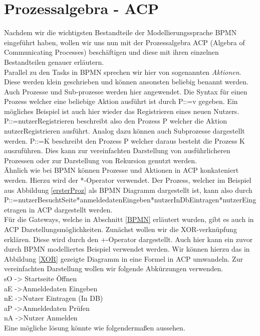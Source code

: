 \section {Prozessalgebra - ACP}\label {Prozessalgebra - ACP}
Nachdem wir die wichtigsten Bestandteile der Modellierungssprache BPMN eingeführt haben, wollen wir uns nun mit der Prozessalgebra ACP (Algebra of Communicating Processes) beschäftigen und diese mit ihren einzelnen Bestandteilen genauer erläutern.\\
Parallel zu den Tasks in BPMN sprechen wir hier von sogenannten \textit{Aktionen}. Diese werden klein geschrieben und können ansonsten beliebig benannt werden. Auch Prozesse und Sub-prozesse werden hier angewendet. Die Syntax für einen Prozess welcher eine beliebige Aktion ausführt ist durch P::=v gegeben. Ein mögliches Beispiel ist auch hier wieder das Registrieren eines neuen Nutzers. P::=nutzerRegistrieren beschreibt also den Prozess P welcher die Aktion nutzerRegistrieren ausführt. Analog dazu können auch Subprozesse dargestellt werden. P::=K beschreibt den Prozess P welcher daraus besteht die Prozess K auszuführen. Dies kann zur vereinfachten Darstellung von ausführlicheren Prozessen oder zur Darstellung von Rekursion genutzt werden.\\
Ähnlich wie bei BPMN können Prozesse und Aktionen in ACP konkateniert werden. Hierzu wird der *-Operator verwendet. Der Prozess, welcher im Beispiel aus Abbildung \ref{ersterProz} als BPMN Diagramm dargestellt ist, kann also durch P::=nutzerBesuchtSeite*anmeldedatenEingeben*nutzerInDbEintragen*nutzerEingetragen in ACP dargestellt werden.\\
Für die Gateways, welche in Abschnitt \ref{BPMN} erläutert wurden, gibt es auch in ACP Darstellungsmöglichkeiten. Zunächst wollen wir die XOR-verknüpfung erklären. Diese wird durch den +-Operator dargestellt. Auch hier kann ein zuvor durch BPMN modelliertes Beispiel verwendet werden. Wir können hierzu das in Abbildung \ref{XOR} gezeigte Diagramm in eine Formel in ACP umwandeln. Zur vereinfachten Darstellung wollen wir folgende Abkürzungen verwenden.\\
sO -> Startseite Öffnen\\
aE ->Anmeldedaten Eingeben\\
nE ->Nutzer Eintragen (In DB)\\
aP ->Anmeldedaten Prüfen\\
nA ->Nutzer Anmelden\\
Eine mögliche lösung könnte wie folgendermaßen aussehen.\\
